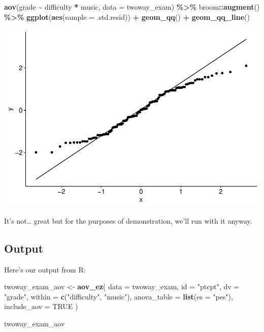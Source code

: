 \documentclass[
]{book}
\newenvironment{Shaded}{\begin{snugshade}}{\end{snugshade}}
\newcommand{\AttributeTok}[1]{\textcolor[rgb]{0.13,0.29,0.53}{#1}}
\newcommand{\ConstantTok}[1]{\textcolor[rgb]{0.56,0.35,0.01}{#1}}
\newcommand{\FunctionTok}[1]{\textcolor[rgb]{0.13,0.29,0.53}{\textbf{#1}}}
\newcommand{\NormalTok}[1]{#1}
\newcommand{\OtherTok}[1]{\textcolor[rgb]{0.56,0.35,0.01}{#1}}
\newcommand{\SpecialCharTok}[1]{\textcolor[rgb]{0.81,0.36,0.00}{\textbf{#1}}}
\newcommand{\StringTok}[1]{\textcolor[rgb]{0.31,0.60,0.02}{#1}}
\begin{document}
\begin{Shaded}
\begin{Highlighting}[]
\FunctionTok{aov}\NormalTok{(grade }\SpecialCharTok{\textasciitilde{}}\NormalTok{ difficulty }\SpecialCharTok{*}\NormalTok{ music, }\AttributeTok{data =}\NormalTok{ twoway\_exam) }\SpecialCharTok{\%\textgreater{}\%}
\NormalTok{  broom}\SpecialCharTok{::}\FunctionTok{augment}\NormalTok{() }\SpecialCharTok{\%\textgreater{}\%}
  \FunctionTok{ggplot}\NormalTok{(}\FunctionTok{aes}\NormalTok{(}\AttributeTok{sample =}\NormalTok{ .std.resid)) }\SpecialCharTok{+}
  \FunctionTok{geom\_qq}\NormalTok{() }\SpecialCharTok{+}
  \FunctionTok{geom\_qq\_line}\NormalTok{()}
\end{Highlighting}
\end{Shaded}

\includegraphics{_main_files/figure-latex/unnamed-chunk-237-1.pdf}

It's not\ldots{} great but for the purposes of demonstration, we'll run with it anyway.

\hypertarget{output-8}{%
\subsection{Output}\label{output-8}}

Here's our output from R:

\begin{Shaded}
\begin{Highlighting}[]
\NormalTok{twoway\_exam\_aov }\OtherTok{\textless{}{-}} \FunctionTok{aov\_ez}\NormalTok{(}
  \AttributeTok{data =}\NormalTok{ twoway\_exam,}
  \AttributeTok{id =} \StringTok{"ptcpt"}\NormalTok{,}
  \AttributeTok{dv =} \StringTok{"grade"}\NormalTok{,}
  \AttributeTok{within =} \FunctionTok{c}\NormalTok{(}\StringTok{"difficulty"}\NormalTok{, }\StringTok{"music"}\NormalTok{),}
  \AttributeTok{anova\_table =} \FunctionTok{list}\NormalTok{(}\AttributeTok{es =} \StringTok{"pes"}\NormalTok{),}
  \AttributeTok{include\_aov =} \ConstantTok{TRUE}
\NormalTok{)}

\NormalTok{twoway\_exam\_aov}
\end{Highlighting}
\end{Shaded}
\end{document}
